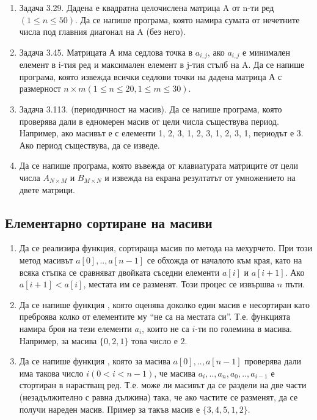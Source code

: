 {\begin{enumerate}[resume]
	\item Задача 3.29. \cite{sbornik} Дадена е квадратна целочислена матрица A от n-ти ред $(1 \leq n \leq 50)$. Да се напише програма, която намира сумата от нечетните числа под главния диагонал на A (без него).

  \item Задача 3.45. \cite{sbornik} Матрицата А има седлова точка в $a_{i,j}$, ако $a_{i,j}$ е минимален елемент в i-тия ред и максимален елемент в j-тия стълб на A. Да се напише програма, която извежда всички седлови точки на дадена матрица А с размерност $n \times m (1 \leq n \leq 20, 1 \leq m \leq 30)$.

	\item Задача 3.113. (периодичност на масив). \cite{sbornik}	Да се напише програма, която проверява дали в едномерен масив от цели числа съществува период. Например, ако масивът е с елементи 1, 2, 3, 1, 2, 3, 1, 2, 3, 1, периодът е 3. Ако период съществува, да се изведе.

	\item Да се напише програма, която въвежда от клавиатурата матриците от цели числа $A_{N\times M}$ и $B_{M\times N}$ и извежда на екрана резултатът от умножението на двете матрици.


\end{enumerate}

\subsection {Елементарно сортиране на масиви}

\begin{enumerate}[resume]
  \item Да се реализира функция, сортираща масив по метода на мехурчето. При този метод масивът $a[0],..,a[n-1]$ се обхожда от началото към края, като на всяка стъпка се сравняват двойката съседни елементи $a[i]$ и $a[i+1]$. Ако $a[i+1] < a[i]$, местата им се разменят. Този процес се извършва $n$ пъти.
  \item Да се напише функция , която оценява доколко един масив е несортиран като преброява колко от елементите му ``не са на местата си''. Т.е. функцията намира броя на тези елементи $a_i$, които не са $i$-ти по големина в масива. Например, за масива $\{0,2,1\}$ това число е $2$.
  \item Да се напише функция , която за масива $a[0],..,a[n-1]$ проверява дали има такова число $i(0 < i < n-1)$, че масива $a_i,..,a_n,a_0,..,a_{i-1}$ е стортиран в нарастващ ред. Т.е. може ли масивът да се раздели на две части (незадължително с равна дължина) така, че ако частите се разменят, да се получи нареден масив. Пример за такъв масив е $\{3,4,5,1,2\}$.


\end{enumerate}}

